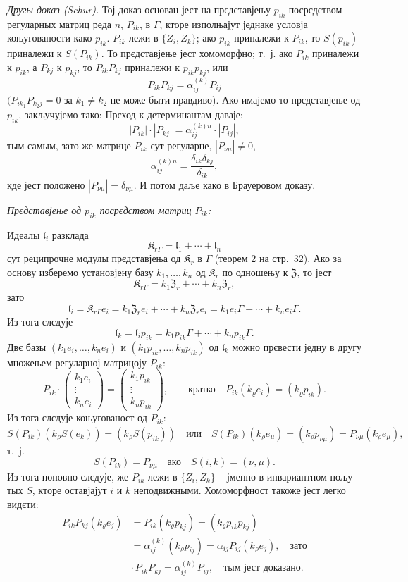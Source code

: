\documentclass[11pt]{article}
\begin{document}
\emph{Другы доказ (Schur).} Тој доказ основан јест на прєдставјењу \(p_{ik}\) посрєдством регуларных матриц реда \(n\), \(P_{ik}\), в \(\Gamma\), кторе изполњајут једнаке условја коњугованости како \(p_{ik}\). \(P_{ik}\) лежи в \(\{Z_i,Z_k\}\); ако \(p_{ik}\) приналежи к \(P_{ik}\), то \(S(p_{ik})\) приналежи к \(S(P_{ik})\). То прєдставјење јест хомоморфно; т.~ј. ако \(P_{ik}\) приналежи к \(p_{ik}\), а \(P_{kj}\) к \(p_{kj}\), то \(P_{ik}P_{kj}\) приналежи к \(p_{ik}p_{kj}\), или
\[
P_{ik}P_{kj}=\alpha_{ij}^{(k)}P_{ij}
\]
\((P_{ik_1}P_{k_2j}=0\) за \(k_1\neq k_2\) не може быти правдиво). Ако имајемо то прєдставјење од \(p_{ik}\), закључујемо тако: Прєход к детерминантам даваје:
\[
|P_{ik}|\cdot |P_{kj}|=\alpha_{ij}^{(k)n}\cdot |P_{ij}|,
\]
тым самым, зато же матрице \(P_{ik}\) сут регуларне, \(|P_{\nu\mu}|\ne0\),
\[
\alpha_{ij}^{(k)n}=\frac{\delta_{ik}\delta_{kj}}{\delta_{ik}},
\]
кде јест положено \(|P_{\nu\mu}|=\delta_{\nu\mu}\). И потом даље како в Брауеровом доказу.

\emph{Прєдставјење од \(p_{ik}\) посрєдством матриц \(P_{ik}\):}

Идеалы \(\mathfrak l_i\) разклада
\[
\mathfrak K_{r\Gamma}=\mathfrak l_1+\cdots+\mathfrak l_n
\]
сут реципрочне модулы прєдставјења од \(\mathfrak K_r\) в \(\Gamma\) (теорем 2 на стр.~32). Ако за основу изберемо установјену базу \(k_1,\ldots,k_n\) од \(\mathfrak K_r\) по одношењу к \(\mathfrak Z\), то јест
\[
\mathfrak K_{r\Gamma}=k_1\mathfrak Z_r+\cdots+k_n\mathfrak Z_r,
\]
зато
\[
\mathfrak l_i=\mathfrak K_{r\Gamma}e_i
=k_1\mathfrak Z_r e_i+\cdots+k_n\mathfrak Z_r e_i
=k_1e_i\Gamma+\cdots+k_ne_i\Gamma.
\]
Из тога слєдује
\[
\mathfrak l_k=\mathfrak l_i p_{ik}
=k_1p_{ik}\Gamma+\cdots+k_np_{ik}\Gamma.
\]
Двє базы \((k_1e_i,\ldots,k_ne_i)\) и \((k_1p_{ik},\ldots,k_np_{ik})\) од \(\mathfrak l_k\) можно прєвести једну в другу множењем регуларној матрицоју \(P_{ik}\):
\[
P_{ik}\cdot
\begin{pmatrix}
k_1e_i\\ \vdots\\ k_ne_i
\end{pmatrix}
=
\begin{pmatrix}
k_1p_{ik}\\ \vdots\\ k_np_{ik}
\end{pmatrix},
\qquad
\text{кратко}\quad
P_{ik}(k_\varrho e_i)=(k_\varrho p_{ik}).
\]
Из тога слєдује коњугованост од \(P_{ik}\):
\[
S(P_{ik})(k_\varrho S(e_k))=(k_\varrho S(p_{ik}))
\quad\text{или}\quad
S(P_{ik})(k_\varrho e_\mu)=(k_\varrho p_{\nu\mu})
=P_{\nu\mu}(k_\varrho e_\mu),
\]
т.~ј.
\[
S(P_{ik})=P_{\nu\mu}\quad\text{ако}\quad S(i,k)=(\nu,\mu).
\]
Из тога поновно слєдује, же \(P_{ik}\) лежи в \(\{Z_i,Z_k\}\) -- јменно в инвариантном пољу тых \(S\), кторе оставјајут \(i\) и \(k\) неподвижными. Хомоморфност такоже јест легко видєти:
\[
\begin{split}
P_{ik}P_{kj}(k_\varrho e_j)
&=P_{ik}(k_\varrho p_{kj})
=(k_\varrho p_{ik}p_{kj})\\
&=\alpha_{ij}^{(k)}(k_\varrho p_{ij})
=\alpha_{ij}P_{ij}(k_\varrho e_j),
\quad\text{зато}\\
&\cdot\, P_{ik}P_{kj}=\alpha_{ij}^{(k)}P_{ij},
\quad\text{тым јест доказано.}
\end{split}
\]
\end{document}
